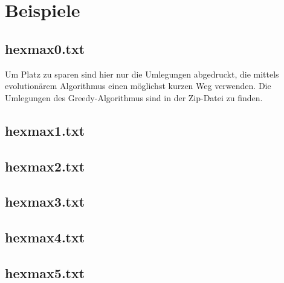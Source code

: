 \documentclass[a4paper,10pt,ngerman]{scrartcl}
\begin{document}
\section{Beispiele}
\subsection*{hexmax0.txt}

Um Platz zu sparen sind hier nur die Umlegungen abgedruckt, die mittels evolutionärem Algorithmus einen möglichst kurzen Weg verwenden. Die Umlegungen des Greedy-Algorithmus sind in der Zip-Datei zu finden.
\subsection*{hexmax1.txt}

\subsection*{hexmax2.txt}

\subsection*{hexmax3.txt}

\subsection*{hexmax4.txt}

\subsection*{hexmax5.txt}

\end{document}
